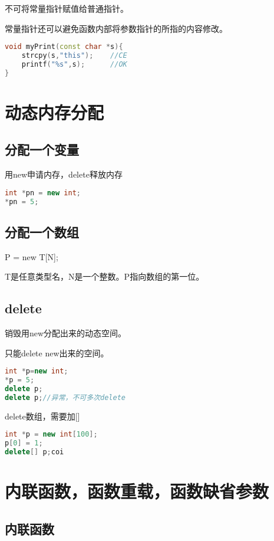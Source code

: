 \documentclass[UTF8]{ctexart}
\begin{document}
不可将常量指针赋值给普通指针。

常量指针还可以避免函数内部将参数指针的所指的内容修改。
\begin{lstlisting}[language=C++]
void myPrint(const char *s){
	strcpy(s,"this");    //CE
	printf("%s",s);      //OK
}
\end{lstlisting}



\section{动态内存分配}

\subsection{分配一个变量}
用new申请内存，delete释放内存
\begin{lstlisting}[language=C++]
int *pn = new int;
*pn = 5;
\end{lstlisting}
\subsection{分配一个数组}
P = new T[N];

T是任意类型名，N是一个整数。P指向数组的第一位。

\subsection{delete}
销毁用new分配出来的动态空间。

只能delete new出来的空间。

\begin{lstlisting}[language=C++]
int *p=new int;
*p = 5;
delete p;
delete p;//异常，不可多次delete
\end{lstlisting}

delete数组，需要加[]
\begin{lstlisting}[language=C++]
int *p = new int[100];
p[0] = 1;
delete[] p;coi
\end{lstlisting}

\section{内联函数，函数重载，函数缺省参数}

\subsection{内联函数}
\end{document}
